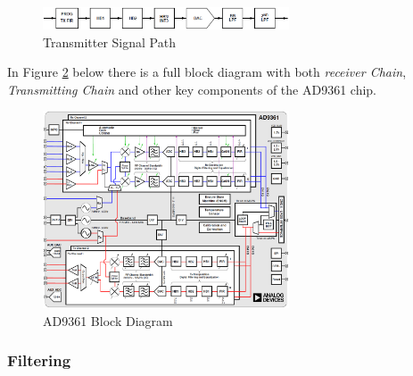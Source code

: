 \begin{figure}[htbp]
    \centering
    \includegraphics[width=0.65\textwidth]{./figures/tx_chain}
    \caption{ Transmitter Signal Path
    \label{fig:txchain}}
\end{figure}


%

In Figure \ref{fig:ad9361blk} below there is a full block diagram with both
\textit{receiver Chain}, \textit{Transmitting Chain} and other key components of
the AD9361 chip.

\begin{figure}[htbp]
    \centering
    \includegraphics[width=0.65\textwidth]{./figures/ad9361_block_diagram}
    \caption{ AD9361 Block Diagram
    \label{fig:ad9361blk}}
\end{figure}

\subsubsection{Filtering}

